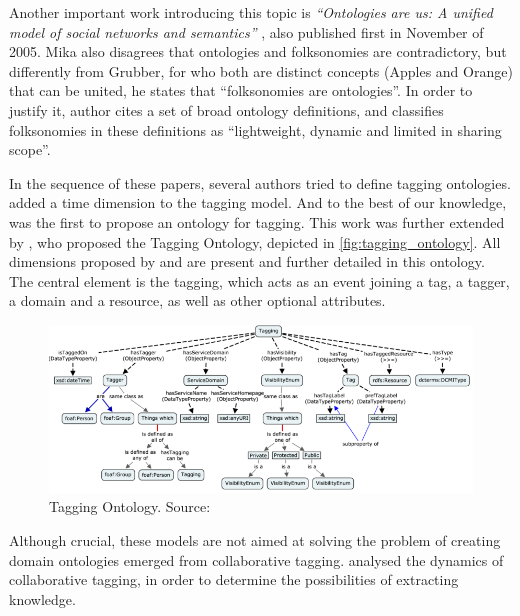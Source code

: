 Another important work introducing this topic is \emph{``Ontologies are us: A unified model of social networks and semantics''} \cite{Mika2007}, also published first in November of 2005.
Mika also disagrees that ontologies and folksonomies are contradictory, but differently from Grubber, for who both are distinct concepts (Apples and Orange) that can be united, he states that ``folksonomies are ontologies''.
In order to justify it, author cites a set of broad ontology definitions, and classifies folksonomies in these definitions as ``lightweight, dynamic and limited in sharing scope''.

In the sequence of these papers, several authors tried to define tagging ontologies.
 added a time dimension to the tagging model.
And to the best of our knowledge,  was the first to propose an ontology for tagging.
This work was further extended by , who proposed the Tagging Ontology, depicted in \autoref{fig:tagging_ontology}.
All dimensions proposed by  and  are present and further detailed in this ontology.
The central element is the tagging, which acts as an event joining a tag, a tagger, a domain and a resource, as well as other optional attributes.

\begin{figure}[t]
\begin{center}
\includegraphics[width=\columnwidth]{images/tagging_ontology.png}
\caption[Tagging Ontology.]{Tagging Ontology. Source:  }
\label{fig:tagging_ontology}
\end{center}
\end{figure}

Although crucial, these models are not aimed at solving the problem of creating domain ontologies emerged from collaborative tagging.
 analysed the dynamics of collaborative tagging, in order to determine the possibilities of extracting knowledge.

